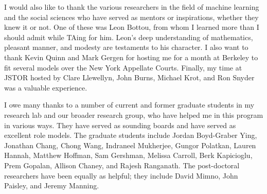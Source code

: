 I would also like to thank the various researchers in the field of
machine learning and the social sciences who have served as mentors or
inspirations, whether they knew it or not.  One of these was Leon
Bottou, from whom I learned more than I should admit while TAing for
him. Leon's deep understanding of mathematics, pleasant manner, and
modesty are testaments to his character.  I also want to thank Kevin
Quinn and Mark Gergen for hosting me for a month at Berkeley to fit
several models over the New York Appellate Courts.  Finally, my time
at JSTOR hosted by Clare Llewellyn, John Burns, Michael Krot, and Ron
Snyder was a valuable experience.

I owe many thanks to a number of current and former graduate students
in my research lab and our broader research group, who have helped me
in this program in various ways.  They have served as sounding boards
and have served as excellent role models.  The graduate students
include Jordan Boyd-Graber Ying, Jonathan Chang, Chong Wang, Indraneel
Mukherjee, Gungor Polatkan, Lauren Hannah, Matthew Hoffman, Sam
Gershman, Melissa Carroll, Berk Kapicioglu, Prem Gopalan, Allison
Chaney, and Rajesh Ranganath.  The post-doctoral researchers have been
equally as helpful; they include David Mimno, John Paisley, and Jeremy
Manning.



